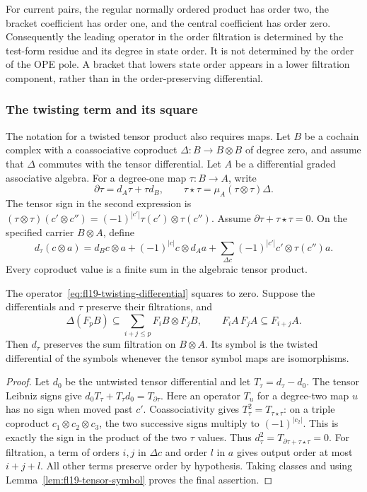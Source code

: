 For current pairs, the regular normally ordered product has order two, the bracket coefficient has order one, and the central coefficient has order zero.
Consequently the leading operator in the order filtration is determined by the test-form residue and its degree in state order.
It is not determined by the order of the OPE pole.
A bracket that lowers state order appears in a lower filtration component, rather than in the order-preserving differential.

\subsubsection{The twisting term and its square}

The notation for a twisted tensor product also requires maps.
Let $B$ be a cochain complex with a coassociative coproduct
$\Delta:B\to B\otimes B$ of degree zero, and assume that $\Delta$ commutes with the tensor differential.
Let $A$ be a differential graded associative algebra.
For a degree-one map $\tau:B\to A$, write
\[
\partial\tau=d_A\tau+\tau d_B,
\qquad \tau\star\tau=\mu_A(\tau\otimes\tau)\Delta.
\]
The tensor sign in the second expression is
$(\tau\otimes\tau)(c'\otimes c'')=(-1)^{|c'|}\tau(c')\otimes\tau(c'')$.
Assume $\partial\tau+\tau\star\tau=0$.
On the specified carrier $B\otimes A$, define
\begin{equation}\label{eq:fl19-twisting-differential}
d_\tau(c\otimes a)=d_Bc\otimes a+(-1)^{|c|}c\otimes d_Aa
 +\sum_{\Delta c}(-1)^{|c'|}c'\otimes\tau(c'')a.
\end{equation}
Every coproduct value is a finite sum in the algebraic tensor product.

\begin{lemma}\label{lem:fl19-filtered-twisting}
The operator~\eqref{eq:fl19-twisting-differential} squares to zero.
Suppose the differentials and $\tau$ preserve their filtrations, and
\[
\Delta(F_pB)\subseteq\sum_{i+j\le p}F_iB\otimes F_jB,
\qquad F_iA\,F_jA\subseteq F_{i+j}A.
\]
Then $d_\tau$ preserves the sum filtration on $B\otimes A$.
Its symbol is the twisted differential of the symbols whenever the tensor symbol maps are isomorphisms.
\end{lemma}
\begin{proof}
Let $d_0$ be the untwisted tensor differential and let $T_\tau=d_\tau-d_0$.
The tensor Leibniz signs give
$d_0T_\tau+T_\tau d_0=T_{\partial\tau}$.
Here an operator $T_u$ for a degree-two map $u$ has no sign when moved past $c'$.
Coassociativity gives $T_\tau^2=T_{\tau\star\tau}$:
on a triple coproduct $c_1\otimes c_2\otimes c_3$, the two successive signs multiply to $(-1)^{|c_2|}$.
This is exactly the sign in the product of the two $\tau$ values.
Thus $d_\tau^2=T_{\partial\tau+\tau\star\tau}=0$.
For filtration, a term of orders $i,j$ in $\Delta c$ and order $l$ in $a$ gives output order at most $i+j+l$.
All other terms preserve order by hypothesis.
Taking classes and using Lemma~\ref{lem:fl19-tensor-symbol} proves the final assertion.
\end{proof}

